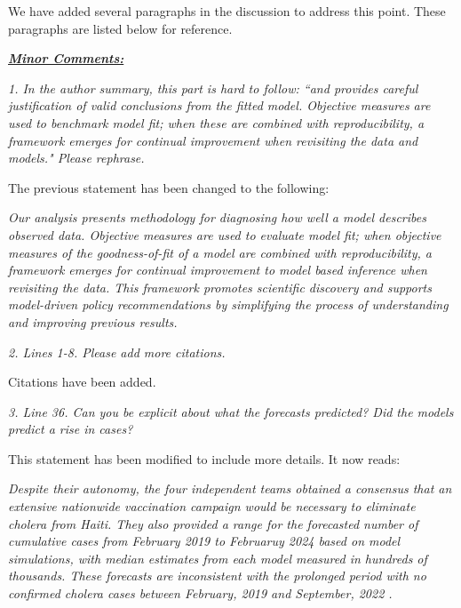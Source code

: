 \documentclass[11pt]{article}
\newcommand\report[1]{{\color{mygreen} \vspace{1mm}\hspace{0.25in}\parbox{6in}{\em #1}}}
\newcommand\article[1]{{\color{blue} \vspace{1mm}\hspace{0.25in}\parbox{6in}{\em #1}}}
\begin{document}
We have added several paragraphs in the discussion to address this point. These paragraphs are listed below for reference.

\article{\editDiscussionOne}

\article{\editDiscussionTwo}

\article{\editDiscussionThree}

\article{\editDiscussionFour}

\article{\editDiscussionFive}


\report{
  \textbf{\underline{Minor Comments:}}
}

\report{
  1. In the author summary, this part is hard to follow: ``and provides careful justification of valid conclusions from the fitted model. Objective measures are used to benchmark model fit; when these are combined with reproducibility, a framework emerges for continual improvement when revisiting the data and models." Please rephrase.
}

The previous statement has been changed to the following:

\article{Our analysis presents methodology for diagnosing how well a model describes observed data. Objective measures are used to evaluate model fit; when objective measures of the goodness-of-fit of a model are combined with reproducibility, a framework emerges for continual improvement to model based inference when revisiting the data. This framework promotes scientific discovery and supports model-driven policy recommendations by simplifying the process of understanding and improving previous results.}

\report{
  2. Lines 1-8. Please add more citations.
}

Citations have been added.

\report{
  3. Line 36. Can you be explicit about what the forecasts predicted? Did the models predict a rise in cases?
}

This statement has been modified to include more details. It now reads:

\article{Despite their autonomy, the four independent teams obtained a consensus that an extensive nationwide vaccination campaign would be necessary to eliminate cholera from Haiti. They also provided a range for the forecasted number of cumulative cases from February 2019 to Februaruy 2024 based on model simulations, with median estimates from each model measured in hundreds of thousands.
These forecasts are inconsistent with the prolonged period with no confirmed cholera cases between February, 2019 and September, 2022 \cite{trevisin22}.}
\end{document}
